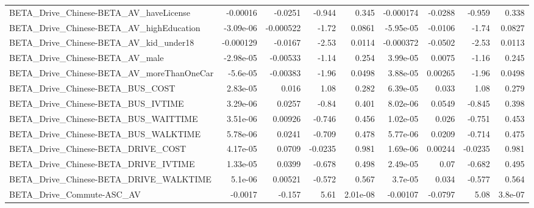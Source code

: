 \begin{tabular}{lrrrrrrrr}
BETA\_Drive\_Chinese-BETA\_AV\_haveLicense             &    -0.00016 &      -0.0251 &   -0.944 &    0.345 &  -0.000174 &     -0.0288 &       -0.959 &         0.338 \\
BETA\_Drive\_Chinese-BETA\_AV\_highEducation           &   -3.09e-06 &    -0.000522 &    -1.72 &   0.0861 &  -5.95e-05 &     -0.0106 &        -1.74 &        0.0827 \\
BETA\_Drive\_Chinese-BETA\_AV\_kid\_under18             &   -0.000129 &      -0.0167 &    -2.53 &   0.0114 &  -0.000372 &     -0.0502 &        -2.53 &        0.0113 \\
BETA\_Drive\_Chinese-BETA\_AV\_male                    &   -2.98e-05 &     -0.00533 &    -1.14 &    0.254 &   3.99e-05 &      0.0075 &        -1.16 &         0.245 \\
BETA\_Drive\_Chinese-BETA\_AV\_moreThanOneCar          &    -5.6e-05 &     -0.00383 &    -1.96 &   0.0498 &   3.88e-05 &     0.00265 &        -1.96 &        0.0498 \\
BETA\_Drive\_Chinese-BETA\_BUS\_COST                   &    2.83e-05 &        0.016 &     1.08 &    0.282 &   6.39e-05 &       0.033 &         1.08 &         0.279 \\
BETA\_Drive\_Chinese-BETA\_BUS\_IVTIME                 &    3.29e-06 &       0.0257 &    -0.84 &    0.401 &   8.02e-06 &      0.0549 &       -0.845 &         0.398 \\
BETA\_Drive\_Chinese-BETA\_BUS\_WAITTIME               &    3.51e-06 &      0.00926 &   -0.746 &    0.456 &   1.02e-05 &       0.026 &       -0.751 &         0.453 \\
BETA\_Drive\_Chinese-BETA\_BUS\_WALKTIME               &    5.78e-06 &       0.0241 &   -0.709 &    0.478 &   5.77e-06 &      0.0209 &       -0.714 &         0.475 \\
BETA\_Drive\_Chinese-BETA\_DRIVE\_COST                 &    4.17e-05 &       0.0709 &  -0.0235 &    0.981 &   1.69e-06 &     0.00244 &      -0.0235 &         0.981 \\
BETA\_Drive\_Chinese-BETA\_DRIVE\_IVTIME               &    1.33e-05 &       0.0399 &   -0.678 &    0.498 &   2.49e-05 &        0.07 &       -0.682 &         0.495 \\
BETA\_Drive\_Chinese-BETA\_DRIVE\_WALKTIME             &     5.1e-06 &      0.00521 &   -0.572 &    0.567 &    3.7e-05 &       0.034 &       -0.577 &         0.564 \\
BETA\_Drive\_Commute-ASC\_AV                          &     -0.0017 &       -0.157 &     5.61 & 2.01e-08 &   -0.00107 &     -0.0797 &         5.08 &       3.8e-07 \\

\end{tabular}
